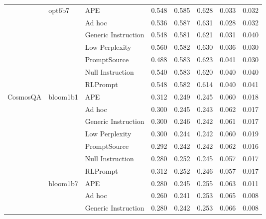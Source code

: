 \begin{supertabular}{lllrrrrr}
              & opt6b7 & APE &            0.548 &           0.585 &          0.628 &        0.033 &    0.032 \\
              &        & Ad hoc &            0.536 &           0.587 &          0.631 &        0.028 &    0.032 \\
              &        & Generic Instruction &            0.548 &           0.581 &          0.621 &        0.031 &    0.040 \\
              &        & Low Perplexity &            0.560 &           0.582 &          0.630 &        0.036 &    0.030 \\
              &        & PromptSource &            0.488 &           0.583 &          0.623 &        0.041 &    0.030 \\
              &        & Null Instruction &            0.540 &           0.583 &          0.620 &        0.040 &    0.040 \\
              &        & RLPrompt &            0.548 &           0.582 &          0.614 &        0.040 &    0.041 \\
CosmosQA & bloom1b1 & APE &            0.312 &           0.249 &          0.245 &        0.060 &    0.018 \\
              &        & Ad hoc &            0.300 &           0.245 &          0.243 &        0.062 &    0.017 \\
              &        & Generic Instruction &            0.300 &           0.246 &          0.242 &        0.061 &    0.017 \\
              &        & Low Perplexity &            0.300 &           0.244 &          0.242 &        0.060 &    0.019 \\
              &        & PromptSource &            0.292 &           0.242 &          0.242 &        0.062 &    0.016 \\
              &        & Null Instruction &            0.280 &           0.252 &          0.245 &        0.057 &    0.017 \\
              &        & RLPrompt &            0.312 &           0.252 &          0.246 &        0.057 &    0.017 \\
              & bloom1b7 & APE &            0.280 &           0.245 &          0.255 &        0.063 &    0.011 \\
              &        & Ad hoc &            0.260 &           0.241 &          0.253 &        0.065 &    0.008 \\
              &        & Generic Instruction &            0.280 &           0.242 &          0.253 &        0.066 &    0.008 \\

\end{supertabular}
